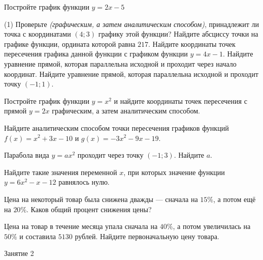 %
%

\begin{class}[number=1]
	\begin{listofex}
		\item {}
		\item Постройте график функции \( y=2x-5 \)
		\begin{tasks}(1)
			\task Проверьте \textit{(графическим, а затем аналитическим способом)}, принадлежит ли точка с координатами \( (4;3) \) графику этой функции?
			\task Найдите абсциссу точки на графике функции, ордината которой равна \( 217 \).
			\task Найдите координаты точек пересечения графика данной функции с графиком функции \( y=4x-1 \).
			\task Найдите уравнение прямой, которая параллельна исходной и проходит через начало координат.
			\task Найдите уравнение прямой, которая параллельна исходной и проходит точку \( (-1;1) \).
		\end{tasks}
		\item Постройте график функции \(y=x^2\) и найдите координаты точек пересечения с прямой \( y=2x \) графическим, а затем аналитическим способом.
		\item Найдите аналитическим способом точки пересечения графиков функций \(f(x)=x^2+3x-10\)	и \( g(x)=-3x^2-9x-19 \).
		\item Парабола вида \( y=ax^2 \) проходит через точку \( (-1;3) \). Найдите \( a \).
		\item Найдите такие значения переменной \( x \), при которых значение функции \( y=6x^2-x-12 \) равнялось нулю.
		\item Цена на некоторый товар была снижена дважды --- сначала на \( 15\% \), а потом ещё на \( 20\% \). Каков общий процент снижения цены?
		\item Цена на товар в течение месяца упала сначала на \( 40\% \), а потом увеличилась на \( 50\% \) и составила \( 5130  \) рублей. Найдите первоначальную цену товара.
	\end{listofex}
\end{class}

\begin{class}[number=2]
	\begin{listofex}
		\item Занятие 2
	\end{listofex}
\end{class}

